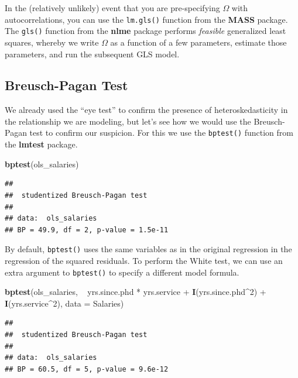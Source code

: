 \documentclass[12pt,oneside,openany]{book}
\newenvironment{Shaded}{\begin{snugshade}}{\end{snugshade}}
\newcommand{\KeywordTok}[1]{\textcolor[rgb]{0.13,0.29,0.53}{\textbf{{#1}}}}
\newcommand{\DataTypeTok}[1]{\textcolor[rgb]{0.13,0.29,0.53}{{#1}}}
\newcommand{\DecValTok}[1]{\textcolor[rgb]{0.00,0.00,0.81}{{#1}}}
\newcommand{\StringTok}[1]{\textcolor[rgb]{0.31,0.60,0.02}{{#1}}}
\newcommand{\NormalTok}[1]{{#1}}
\begin{document}
In the (relatively unlikely) event that you are pre-specifying
\(\Omega\) with autocorrelations, you can use the \texttt{lm.gls()}
function from the \textbf{MASS} package. The \texttt{gls()} function
from the \textbf{nlme} package performs \emph{feasible} generalized
least squares, whereby we write \(\Omega\) as a function of a few
parameters, estimate those parameters, and run the subsequent GLS model.

\subsection{Breusch-Pagan Test}\label{breusch-pagan-test}

We already used the ``eye test'' to confirm the presence of
heteroskedasticity in the relationship we are modeling, but let's see
how we would use the Breusch-Pagan test to confirm our suspicion. For
this we use the \texttt{bptest()} function from the \textbf{lmtest}
package.

\begin{Shaded}
\begin{Highlighting}[]
\KeywordTok{bptest}\NormalTok{(ols_salaries)}
\end{Highlighting}
\end{Shaded}

\begin{verbatim}
## 
##  studentized Breusch-Pagan test
## 
## data:  ols_salaries
## BP = 49.9, df = 2, p-value = 1.5e-11
\end{verbatim}

By default, \texttt{bptest()} uses the same variables as in the original
regression in the regression of the squared residuals. To perform the
White test, we can use an extra argument to \texttt{bptest()} to specify
a different model formula.

\begin{Shaded}
\begin{Highlighting}[]
\KeywordTok{bptest}\NormalTok{(ols_salaries,}
       \NormalTok{~}\StringTok{ }\NormalTok{yrs.since.phd *}\StringTok{ }\NormalTok{yrs.service +}\StringTok{ }\KeywordTok{I}\NormalTok{(yrs.since.phd^}\DecValTok{2}\NormalTok{) +}\StringTok{ }\KeywordTok{I}\NormalTok{(yrs.service^}\DecValTok{2}\NormalTok{),}
       \DataTypeTok{data =} \NormalTok{Salaries)}
\end{Highlighting}
\end{Shaded}

\begin{verbatim}
## 
##  studentized Breusch-Pagan test
## 
## data:  ols_salaries
## BP = 60.5, df = 5, p-value = 9.6e-12
\end{verbatim}
\end{document}
